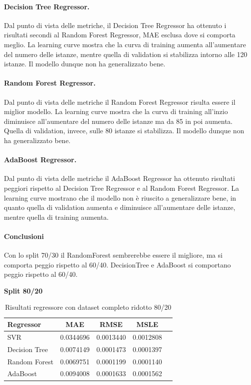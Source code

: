 \paragraph{\textbf{Decision Tree Regressor}.}
Dal punto di vista delle metriche, il Decision Tree Regressor ha ottenuto i risultati secondi al Random Forest Regressor, MAE esclusa dove si comporta meglio.
La learning curve mostra che la curva di training aumenta all'aumentare del numero delle istanze, mentre quella di validation si stabilizza intorno alle 120 istanze. Il modello dunque non ha generalizzato bene.
\paragraph{\textbf{Random Forest Regressor}.}
Dal punto di vista delle metriche il Random Forest Regressor risulta essere il miglior modello.
La learning curve mostra che la curva di training all'inzio diminuisce all'aumentare del numero delle istanze ma da 85 in poi aumenta. Quella di validation, invece, sulle 80 istanze si stabilizza. Il modello dunque non ha generalizzato bene.
\paragraph{\textbf{AdaBoost Regressor}.}
Dal punto di vista delle metriche il AdaBoost Regressor ha ottenuto risultati peggiori rispetto al Decision Tree Regressor e al Random Forest Regressor.
La learning curve mostrano che il modello non è riuscito a generalizzare bene, in quanto quella di validation aumenta e diminuisce all'aumentare delle istanze, mentre quella di training aumenta.

\paragraph{\textbf{Conclusioni}} Con lo split 70/30 il RandomForest sembrerebbe essere il migliore, ma si comporta peggio rispetto al 60/40. DecisionTree e AdaBoost si comportano peggio rispetto al 60/40.


\noindent\textbf{Split 80/20}


\begin{table}[H]
    \centering
    \begin{tabular}{|>{\centering\arraybackslash}m{5cm}|c|c|c|c|}
        \hline
        \textbf{Regressor} & \textbf{MAE} & \textbf{RMSE} & \textbf{MSLE} \\ [10pt]
        \hline
        SVR & 0.0344696 & 0.0013440 & 0.0012808 \\ [10pt]
        \hline
        Decision Tree & 0.0074149 & 0.0001473 & 0.0001397 \\ [10pt]
        \hline
        Random Forest & 0.0069751 & 0.0001199 & 0.0001140 \\ [10pt]
        \hline
        AdaBoost & 0.0094008 & 0.0001633 & 0.0001562 \\ [10pt]
        \hline
    \end{tabular}
    \caption{Risultati regressore con dataset completo ridotto 80/20}
    \label{tab:results}
\end{table}

